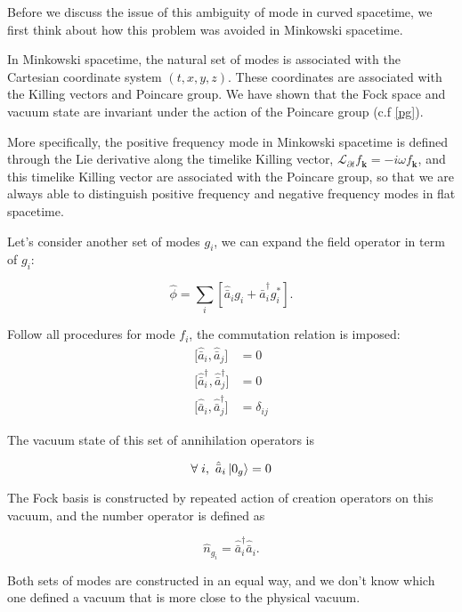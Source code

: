 \documentclass[12pt]{article}
\numberwithin{equation}{subsection}
\theoremstyle{mystyle}{\newtheorem{definition}{Definition}[subsection]}
\theoremstyle{mystyle}{\newtheorem{theorem}[definition]{Theorem}}
\theoremstyle{mystyle}{\newtheorem*{remark}{Remark}}
\theoremstyle{mystyle}{\newtheorem{example}{Example}[subsection]}
\theoremstyle{mystyle}{\newtheorem{examples}{Examples}[subsection]}
\theoremstyle{mystyle}{\newtheorem{cthm}{}[subsection]}
\newcommand{\p}{\partial}
\begin{document}
Before we discuss the issue of this ambiguity of mode in curved spacetime,
we first think about how this problem was avoided in Minkowski spacetime.

In Minkowski spacetime, the natural set of modes is associated with the Cartesian coordinate system \((t,x,y,z)\).
These coordinates are associated with the Killing vectors and Poincare group.
We have shown that the Fock space and vacuum state are invariant under the action of the Poincare group (c.f \ref{pg}).

More specifically, the positive frequency mode in Minkowski spacetime is defined through the Lie derivative along the
timelike Killing vector, \(\mathcal{L}_{\p t}f_{\mathbf{k}}=-i\omega f_{\mathbf{k}}\), and this timelike Killing vector
are associated with the Poincare group, so that we are always able to distinguish positive frequency and negative frequency modes in
flat spacetime.

Let's consider another set of modes \(g_i\), we can expand the field operator in term of \(g_i\):
\begin{cthm}\label{ame}
  \[\hat{\phi}=\sum_i\left[\hat{\bar{a}}_i g_i+\hat{\bar{a}}_i^\dagger g_i^*\right].\]
\end{cthm}
Follow all procedures for mode \(f_i\), the commutation relation is imposed:
\begin{align}
  \bigl[\hat{\bar{a}}_{i},\hat{\bar{a}}_{j}\bigr]                     & =0           \\
  \bigl[\hat{\bar{a}}^{\dagger}_{i},\hat{\bar{a}}^{\dagger}_{j}\bigr] & =0           \\
  \bigl[\hat{\bar{a}}_{i},\hat{\bar{a}}^{\dagger}_{j}\bigr]           & =\delta_{ij}
\end{align}

The vacuum state of this set of annihilation operators is
\begin{cthm}[\(g_i\) vacuum]
  \[\forall\;i,\ \hat{\bar{a}}_i\ket{0_g}=0\]
\end{cthm}
The Fock basis is constructed by repeated action of creation operators on this vacuum, and the number operator is defined as
\begin{cthm}
  \[\hat{n}_{g_i}=\hat{\bar{a}}_i^\dagger \hat{\bar{a}}_i.\]
\end{cthm}

Both sets of modes are constructed in an equal way, and we don't know which one defined a vacuum that is more close to the physical vacuum.
\end{document}
